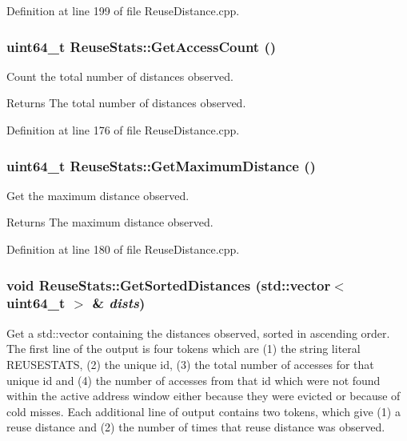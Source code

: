 Definition at line 199 of file ReuseDistance.cpp.

\hypertarget{class_reuse_stats_a48935d131ce635b1b37b2a43f0c52217}{
\subsubsection[{GetAccessCount}]{\setlength{\rightskip}{0pt plus 5cm}uint64\_\-t ReuseStats::GetAccessCount ()}}
\label{class_reuse_stats_a48935d131ce635b1b37b2a43f0c52217}
Count the total number of distances observed.

\begin{DoxyReturn}{Returns}
The total number of distances observed. 
\end{DoxyReturn}


Definition at line 176 of file ReuseDistance.cpp.

\hypertarget{class_reuse_stats_ac70175a532ea2dc608e0fd2f04e4fcbb}{
\subsubsection[{GetMaximumDistance}]{\setlength{\rightskip}{0pt plus 5cm}uint64\_\-t ReuseStats::GetMaximumDistance ()}}
\label{class_reuse_stats_ac70175a532ea2dc608e0fd2f04e4fcbb}
Get the maximum distance observed.

\begin{DoxyReturn}{Returns}
The maximum distance observed. 
\end{DoxyReturn}


Definition at line 180 of file ReuseDistance.cpp.

\hypertarget{class_reuse_stats_adcb657e303c090ac5ef210f6c4506986}{
\subsubsection[{GetSortedDistances}]{\setlength{\rightskip}{0pt plus 5cm}void ReuseStats::GetSortedDistances (std::vector$<$ uint64\_\-t $>$ \& {\em dists})}}
\label{class_reuse_stats_adcb657e303c090ac5ef210f6c4506986}
Get a std::vector containing the distances observed, sorted in ascending order. The first line of the output is four tokens which are (1) the string literal REUSESTATS, (2) the unique id, (3) the total number of accesses for that unique id and (4) the number of accesses from that id which were not found within the active address window either because they were evicted or because of cold misses. Each additional line of output contains two tokens, which give (1) a reuse distance and (2) the number of times that reuse distance was observed.


